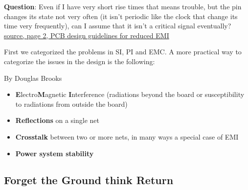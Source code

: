 \documentclass[final]{cubedoc}
\begin{document}
	\textbf{Question}: Even if I have very short rise times that means trouble, but the pin changes its state not very often (it isn't periodic like the clock that change its time very frequently), can I assume that it isn't a critical signal eventually? \href{https://www.ti.com/lit/an/szza009/szza009.pdf}{source, page 2, PCB design guidelines for reduced EMI}
	
	First we categorized the problems in SI, PI and EMC. A more practical way to categorize the issues in the design is the following:
	
	
	
	By Douglas Brooks
	
	\begin{itemize}
		\item \textbf{E}lectro\textbf{M}agnetic \textbf{I}nterference (radiations beyond the board or susceptibility to radiations from outside the board)
		\item \textbf{Reflections} on a single net
		\item \textbf{Crosstalk} between two or more nets, in many ways a special case of EMI
		\item \textbf{Power system stability} 
	\end{itemize}
	
	\subsection{Forget the Ground think Return}
	
	
\end{document}
